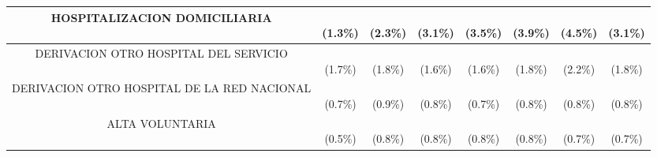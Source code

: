 \begin{table}[htbp]
\begin{tabular}{|c|c|c|c|c|c|c|c|}
\parbox[t]{4.0cm}{\raggedright HOSPITALIZACION DOMICILIARIA} & \parbox[t]{1.2cm}{\\(1.3\%)} & \parbox[t]{1.2cm}{\\(2.3\%)} & \parbox[t]{1.2cm}{\\(3.1\%)} & \parbox[t]{1.2cm}{\\(3.5\%)} & \parbox[t]{1.2cm}{\\(3.9\%)} & \parbox[t]{1.2cm}{\\(4.5\%)} & \parbox[t]{1.6cm}{\\(3.1\%)} \\ \hline
\parbox[t]{4.0cm}{\raggedright DERIVACION OTRO HOSPITAL DEL SERVICIO} & \parbox[t]{1.2cm}{\\(1.7\%)} & \parbox[t]{1.2cm}{\\(1.8\%)} & \parbox[t]{1.2cm}{\\(1.6\%)} & \parbox[t]{1.2cm}{\\(1.6\%)} & \parbox[t]{1.2cm}{\\(1.8\%)} & \parbox[t]{1.2cm}{\\(2.2\%)} & \parbox[t]{1.6cm}{\\(1.8\%)} \\ \hline
\parbox[t]{4.0cm}{\raggedright DERIVACION OTRO HOSPITAL DE LA RED NACIONAL} & \parbox[t]{1.2cm}{\\(0.7\%)} & \parbox[t]{1.2cm}{\\(0.9\%)} & \parbox[t]{1.2cm}{\\(0.8\%)} & \parbox[t]{1.2cm}{\\(0.7\%)} & \parbox[t]{1.2cm}{\\(0.8\%)} & \parbox[t]{1.2cm}{\\(0.8\%)} & \parbox[t]{1.6cm}{\\(0.8\%)} \\ \hline
\parbox[t]{4.0cm}{\raggedright ALTA VOLUNTARIA} & \parbox[t]{1.2cm}{\\(0.5\%)} & \parbox[t]{1.2cm}{\\(0.8\%)} & \parbox[t]{1.2cm}{\\(0.8\%)} & \parbox[t]{1.2cm}{\\(0.8\%)} & \parbox[t]{1.2cm}{\\(0.8\%)} & \parbox[t]{1.2cm}{\\(0.7\%)} & \parbox[t]{1.6cm}{\\(0.7\%)} \\ \hline

\end{tabular}
\end{table}
